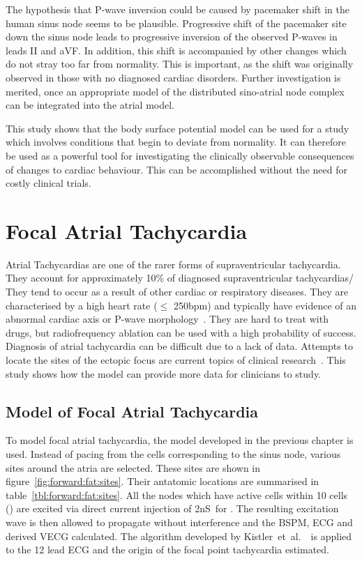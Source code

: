The hypothesis that P-wave inversion could be caused by pacemaker shift in the
human sinus node seems to be plausible.
Progressive shift of the pacemaker site down the sinus node leads to progressive
inversion of the observed P-waves in leads II and aVF.
In addition, this shift is accompanied by other changes which do not stray too
far from normality.
This is important, as the shift was originally observed in those with no
diagnosed cardiac disorders.
Further investigation is merited, once an appropriate model of the distributed
sino-atrial node complex can be integrated into the atrial model.

This study shows that the body surface potential model can be used for a study
which involves conditions that begin to deviate from normality.
It can therefore be used as a powerful tool for investigating the clinically
observable consequences of changes to cardiac behaviour.
This can be accomplished without the need for costly clinical trials.



\section{Focal Atrial Tachycardia}

Atrial Tachycardias are one of the rarer forms of supraventricular
tachycardia.
They account for approximately 10\% of diagnosed supraventricular tachycardias/
They tend to occur as a result of other cardiac or respiratory diseases.
They are characterised by a high heart rate ($\leq$ \unit{250}{bpm}) and
typically have evidence of an abnormal cardiac axis or P-wave
morphology~\cite{MacFarlaneSinus1989}.
They are hard to treat with drugs, but radiofrequency ablation can be used with
a high probability of success.
Diagnosis of atrial tachycardia can be difficult due to a lack of data.
Attempts to locate the sites of the ectopic focus are current topics of clinical
research~\cite{Kistler2006,Kahn2006,Yamane2001}.
This study shows how the model can provide more data for clinicians to study.

\subsection{Model of Focal Atrial Tachycardia}

To model focal atrial tachycardia, the model developed in the previous chapter
is used.
Instead of pacing from the cells corresponding to the sinus node, various sites
around the atria are selected.
These sites are shown in figure~\ref{fig:forward:fat:sites}.
Their antatomic locations are summarised in table~\ref{tbl:forward:fat:sites}.
All the nodes which have active cells within 10 cells () are excited via
direct current injection of \unit{2}{nS}\ for .
The resulting excitation wave is then allowed to propagate without interference
and the BSPM, ECG and derived VECG calculated.
The algorithm developed by Kistler~et~al.~\cite{Kistler2006}\ is applied to the
12 lead ECG and the origin of the focal point tachycardia estimated.

